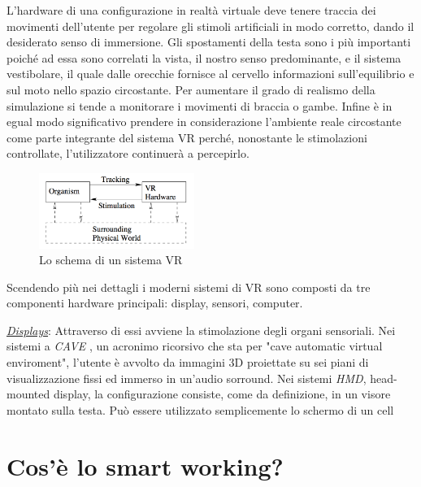 L'hardware di una configurazione in realtà virtuale deve tenere traccia dei movimenti dell'utente per regolare gli stimoli artificiali in modo corretto, dando il desiderato senso di immersione.
Gli spostamenti della testa sono i più importanti poiché ad essa sono correlati la vista, il nostro senso predominante, e il sistema vestibolare, il quale dalle orecchie fornisce al cervello informazioni sull'equilibrio e sul moto nello spazio circostante.\cite{vestibular} Per aumentare il grado di realismo della simulazione si tende a monitorare i movimenti di braccia o gambe. Infine è in egual modo significativo prendere in considerazione l'ambiente reale circostante come parte integrante del sistema VR perché, nonostante  le stimolazioni controllate, l'utilizzatore  continuerà a percepirlo.
\begin{figure}[h]
	\includegraphics[width=0.45\textwidth]{figure/TrackingStimuliBB}
	\centering
	\caption{Lo schema di un sistema VR}
\end{figure}
Scendendo più nei dettagli i moderni sistemi di VR sono composti da tre componenti hardware principali: display, sensori, computer.\newline

\underline{\textit{Displays}}: \hspace{1cm} Attraverso di essi avviene la stimolazione degli organi sensoriali. Nei sistemi a \textit{CAVE} , un acronimo ricorsivo che sta per "cave automatic virtual enviroment", l'utente è avvolto da immagini 3D proiettate su sei piani di visualizzazione fissi ed immerso in un'audio sorround. Nei sistemi \textit{HMD}, head-mounted display, la configurazione consiste, come da definizione, in un visore montato sulla testa. Può essere utilizzato semplicemente lo schermo di un cell





	

\section{Cos'è lo smart working?}

